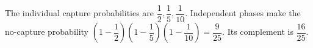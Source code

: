The individual capture probabilities are $\dfrac{1}{2},\dfrac{1}{5},\dfrac{1}{10}$. Independent phases make the no-capture probability $(1-\dfrac{1}{2})(1-\dfrac{1}{5})(1-\dfrac{1}{10})=\dfrac{9}{25}$. Its complement is $\boxed{\dfrac{16}{25}}$.
